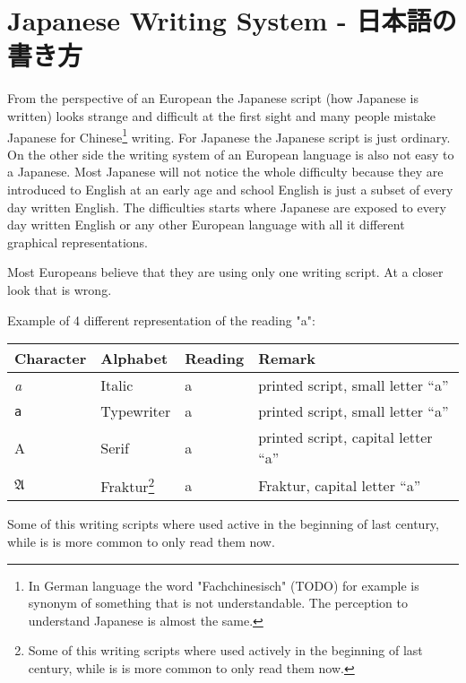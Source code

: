 \chapter{Japanese Writing System - 日本語の書き方}\label{chap:JapaneseWritingSystem}

From the perspective of an European the Japanese script (how Japanese is
written) looks strange and difficult at the first sight and many people mistake
Japanese for Chinese\footnote{In German language the word "Fachchinesisch"
(TODO) for example is synonym of something that is not understandable. The
perception to understand Japanese is almost the same.} writing.  For Japanese
the Japanese script is just ordinary. On the other side the writing system of
an European language is also not easy to a Japanese. Most Japanese will not
notice the whole difficulty because they are introduced to English at an early
age and school English is just a subset of every day written English. The
difficulties starts where Japanese are exposed to every day written English or
any other European language with all it different graphical representations.

Most Europeans believe that they are using only one writing script. At a closer
look that is wrong.

\bigskip Example of 4 different representation of the reading "a":

\begin{center}
\begin{tabular}{|l|l|l|l|}
\textbf{Character}&\textbf{Alphabet}&\textbf{Reading}&\textbf{Remark}\\\hline
\textit{a}     &  Italic        & a & printed script, small letter ``a'' \\ 
\texttt{a}     &  Typewriter    & a & printed script, small letter ``a'' \\ 
A              &  Serif         & a & printed script, capital letter ``a'' \\ 
$\mathfrak{A}$ & Fraktur\footnote{Some of this writing scripts where used 
actively in the beginning of last century, while is is more common to only 
read them now.}& a & Fraktur, capital letter ``a''  \\ 
\end{tabular}
\end{center}

Some of this writing scripts where used active in the beginning of last
century, while is is more common to only read them now. 

